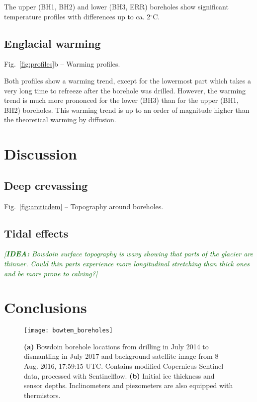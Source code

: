 \documentclass[utf8]{article}
\newcommand{\idea}[1]{\textcolor{darkgreen}{\emph{[\textbf{IDEA:} #1]}}}
\begin{document}
    The upper (BH1, BH2) and lower (BH3, ERR) boreholes show significant
    temperature profiles with differences up to ca. 2$^\circ$C.

\subsection{Englacial warming}

    Fig.~\ref{fig:profiles}b -- Warming profiles.

    Both profiles show a warming trend, except for the lowermost part which
    takes a very long time to refreeze after the borehole was drilled.
    However, the warming trend is much more prononced for the lower (BH3) than
    for the upper (BH1, BH2) boreholes. This warming trend is up to an order of
    magnitude higher than the theoretical warming by diffusion.


\section{Discussion}

\subsection{Deep crevassing}
    Fig.~\ref{fig:arcticdem} -- Topography around boreholes.

\subsection{Tidal effects}
    \idea{Bowdoin surface topography is wavy showing that parts of the glacier
          are thinner. Could thin parts experience more longitudinal
          stretching than thick ones and be more prone to calving?}

\section{Conclusions}


\clearpage

    \begin{figure}
      \centerline{\texttt{[image: bowtem\_boreholes]}}
      \caption{\textbf{(a)} Bowdoin borehole locations from drilling in July
               2014 to dismantling in July 2017 and background satellite
               image from 8 Aug. 2016, 17:59:15 UTC. Contains modified
               Copernicus Sentinel data, processed with Sentinelflow.
               \textbf{(b)} Initial ice thickness and sensor depths.
               Inclinometers and piezometers are also equipped with
               thermistors.}
      \label{fig:boreholes}
    \end{figure}
\end{document}
